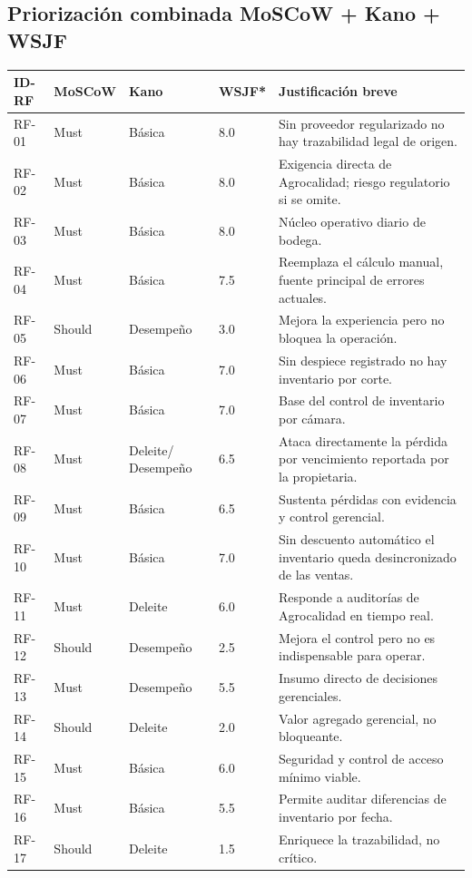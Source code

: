 \documentclass[11pt,a4paper]{article}
\begin{document}
\subsection{Priorización combinada MoSCoW + Kano + WSJF}
\begin{longtable}{|p{1.3cm}|p{1.8cm}|p{2.2cm}|p{1.6cm}|p{7.5cm}|}
\hline
\textbf{ID-RF} & \textbf{MoSCoW} & \textbf{Kano} & \textbf{WSJF*} & \textbf{Justificación breve} \\
\hline
RF-01 & Must & Básica & 8.0 & Sin proveedor regularizado no hay trazabilidad legal de origen. \\
RF-02 & Must & Básica & 8.0 & Exigencia directa de Agrocalidad; riesgo regulatorio si se omite. \\
RF-03 & Must & Básica & 8.0 & Núcleo operativo diario de bodega. \\
RF-04 & Must & Básica & 7.5 & Reemplaza el cálculo manual, fuente principal de errores actuales. \\
RF-05 & Should & Desempeño & 3.0 & Mejora la experiencia pero no bloquea la operación. \\
RF-06 & Must & Básica & 7.0 & Sin despiece registrado no hay inventario por corte. \\
RF-07 & Must & Básica & 7.0 & Base del control de inventario por cámara. \\
RF-08 & Must & Deleite/ Desempeño & 6.5 & Ataca directamente la pérdida por vencimiento reportada por la propietaria. \\
RF-09 & Must & Básica & 6.5 & Sustenta pérdidas con evidencia y control gerencial. \\
RF-10 & Must & Básica & 7.0 & Sin descuento automático el inventario queda desincronizado de las ventas. \\
RF-11 & Must & Deleite & 6.0 & Responde a auditorías de Agrocalidad en tiempo real. \\
RF-12 & Should & Desempeño & 2.5 & Mejora el control pero no es indispensable para operar. \\
RF-13 & Must & Desempeño & 5.5 & Insumo directo de decisiones gerenciales. \\
RF-14 & Should & Deleite & 2.0 & Valor agregado gerencial, no bloqueante. \\
RF-15 & Must & Básica & 6.0 & Seguridad y control de acceso mínimo viable. \\
RF-16 & Must & Básica & 5.5 & Permite auditar diferencias de inventario por fecha. \\
RF-17 & Should & Deleite & 1.5 & Enriquece la trazabilidad, no crítico. \\

\end{longtable}
\end{document}
